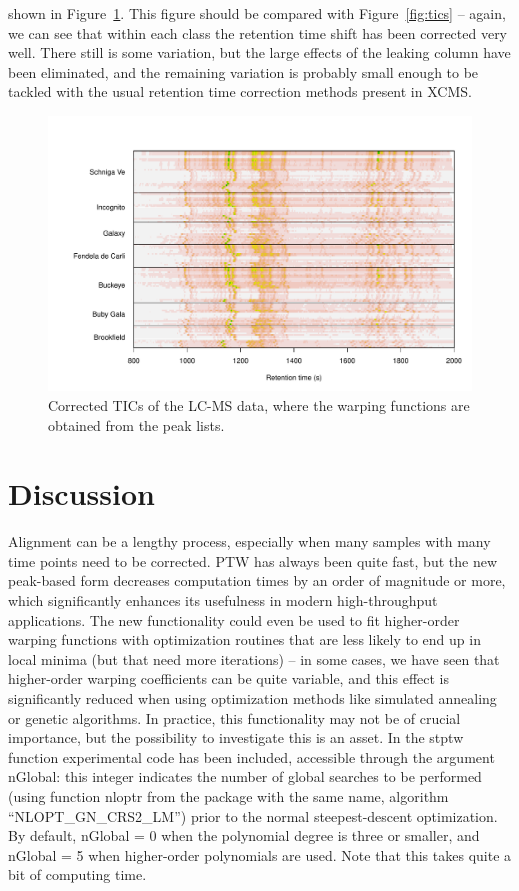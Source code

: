 \documentclass[a4paper,11pt]{article}
\newcommand{\code}[1]{{\ttfamily #1}}
\begin{document}
shown in Figure~\ref{fig:ticsCorr}. This figure should be compared
with Figure~\ref{fig:tics} -- again, we can see that within each class
the retention time shift has been corrected very well. There still is
some variation, but the large effects of the leaking column have been
eliminated, and the remaining variation is probably small enough to be
tackled with the usual retention time correction methods present in
\code{XCMS}.
\begin{figure}[tb]
\centering
{}
\includegraphics{stickPTW-025}
\caption{Corrected TICs of the LC-MS data, where the warping functions
  are obtained from the peak lists.}
\label{fig:ticsCorr}
\end{figure}

\section{Discussion}
Alignment can be a lengthy process, especially when many samples with
many time points need to be corrected. PTW has always been quite fast,
but the new peak-based form decreases computation times by an order of
magnitude or more, which significantly enhances its usefulness in
modern high-throughput applications. The new functionality could even
be used to fit higher-order warping functions with optimization
routines that are less likely to end up in local minima (but that need
more iterations) -- in some cases, we have seen that higher-order
warping coefficients can be quite variable, and this effect is
significantly reduced when using optimization methods like simulated
annealing or genetic algorithms. In practice, this functionality may
not be of crucial importance, but the possibility to investigate this
is an asset. In the \code{stptw} function experimental code has been
included, accessible through the argument \code{nGlobal}: this integer
indicates the number of global searches to be performed (using
function \code{nloptr} from the package with the same name, algorithm
``\code{NLOPT\_GN\_CRS2\_LM}'') prior to the normal steepest-descent
optimization. By default, \code{nGlobal = 0} when the polynomial
degree is three or smaller, and \code{nGlobal = 5} when higher-order
polynomials are used. Note that this takes quite a bit of computing time.
\end{document}
